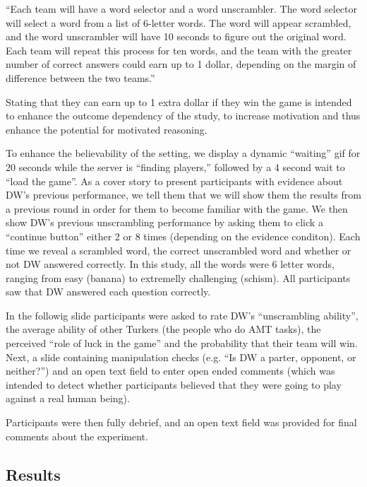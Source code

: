 \documentclass{article}
\begin{document}
``Each team will have a word selector and a word unscrambler. The word selector will select a word from a list of 6-letter words. The word will appear scrambled, and the word unscrambler will have 10 seconds to figure out the original word. Each team will repeat this process for ten words, and the team with the greater number of correct answers could earn up to 1 dollar, depending on the margin of difference between the two teams.''

Stating that they can earn up to 1 extra dollar if they win the game is intended to enhance the outcome dependency of the study, to increase motivation and thus enhance the potential for motivated reasoning. 

To enhance the believability of the setting, we display a dynamic ``waiting'' gif for 20 seconds while the server is ``finding players,'' followed by a 4 second wait to ``load the game''. As a cover story to present participants with evidence about DW's previous performance, we tell them that we will show them the results from a previous round in order for them to become familiar with the game. We then show DW's previous unscrambling performance by asking them to click a ``continue button'' either 2 or 8 times (depending on the evidence conditon). Each time we reveal a scrambled word, the correct unscrambled word and whether or not DW answered correctly. In this study, all the words were 6 letter words, ranging from easy (banana) to extremelly challenging (schism). All participants saw that DW answered each question correctly.

In the followig slide participants were asked to rate DW's ``unscrambling ability'', the average ability of other Turkers (the people who do AMT tasks), the perceived ``role of luck in the game'' and the probability that their team will win. Next, a slide containing manipulation checks (e.g. ``Is DW a parter, opponent, or neither?'') and an open text field to enter open ended comments (which was intended to detect whether participants believed that they were going to play against a real human being).


Participants were then fully debrief, and an open text field was provided for final comments about the experiment. 




\subsection{Results}

\end{document}
